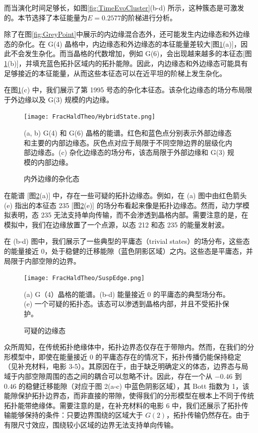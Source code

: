 而当演化时间足够长，如图\ref{fig:TimeEvoCluster}(b-d) 所示，这种簇态是可激发的。本节选择了本征能量为$E=0.2577$的阶梯进行分析。

除了在图\ref{fig:GreyPoint}中展示的内边缘混合态外，还可能发生内边缘态和外边缘态的杂化。在 G(4) 晶格中，内边缘态和外边缘态的本征能量差较大[图\ref{fig:HybridState}(a)]，因此不会发生杂化。而当晶格的代数增加，例如 G(6)，会出现越来越多的本征态[图\ref{fig:HybridState}(b)]，并填充蓝色拓扑区域内的拓扑能隙。因此，内边缘态和外边缘态可能具有足够接近的本征能量，从而这些本征态可以在近平坦的阶梯上发生杂化。

在图\ref{fig:HybridState}(c) 中，我们展示了第 1995 号态的杂化本征态。该杂化边缘态的场分布局限于外边缘以及 G(3) 规模的内边缘。
\begin{figure}[htbp]
    \centering
    \texttt{[image: FracHaldTheo/HybridState.png]}
    \caption{内外边缘的杂化态}(a, b) G(4) 和 G(6) 晶格的能谱。红色和蓝色点分别表示外部边缘态和主要的内部边缘态。灰色点对应于局限于不同空隙边界的层级化内部边缘态。(c) 杂化边缘态的场分布，该态局限于外部边缘和 G(3) 规模的内部边缘。
    \label{fig:HybridState}
\end{figure}

在能谱 [图\ref{fig:SuspEdge}(a)] 中，存在一些可疑的拓扑边缘态。例如，在 (a) 图中由红色箭头 (e) 指出的本征态 235 [图\ref{fig:SuspEdge}(e)] 的场分布看起来像是拓扑边缘态。然而，动力学模拟表明，态 235 无法支持单向传输，而不会渗透到晶格内部。需要注意的是，在模拟中，我们在边缘放置了一个点源，以态 212 和态 235 的能量发射波。

在 (b-d) 图中，我们展示了一些典型的平庸态（trivial states）的场分布，这些态的能量接近 0，处于稳健的迁移能隙（蓝色阴影区域）之内。这些态是平庸态，并局限于内部空隙的边界。
\begin{figure}[htbp]
    \centering
    \texttt{[image: FracHaldTheo/SuspEdge.png]}
    \caption{可疑的边缘态}
    \label{fig:SuspEdge}(a) G（4）晶格的能谱。(b-d) 能量接近 0 的平庸态的典型场分布。(e) 一个可疑的拓扑态。该态可以渗透到晶格内部，并且不受拓扑保护。
\end{figure}

{\color{red}众所周知，在传统拓扑绝缘体中，拓扑边界态仅存在于带隙内。然而，在我们的分形模型中，即使在能量接近 0 的平庸态存在的情况下，拓扑传播仍能保持稳定（见补充材料，电影 3-5）。其原因在于，由于缺乏明确定义的体态，边界态与局域于内部空隙周围的态之间的耦合可以忽略不计。因此，存在一个从 $-0.46$ 到 $0.46$ 的稳健迁移能隙（对应于图 2(a-c) 中蓝色阴影区域），其 Bott 指数为 1，该能隙保护拓扑边界态，而非直接的带隙，使得我们的分形模型在根本上不同于传统拓扑能带绝缘体。需要注意的是，在补充材料的电影 6 中，我们还展示了拓扑传输能够保持的条件：只要边界围绕的区域大于 $G(2)$，拓扑传输仍然存在。由于有限尺寸效应，围绕较小区域的边界无法支持单向传输。}

